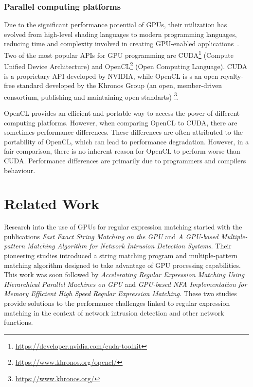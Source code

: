 \documentclass[10pt,onecolumn,twoside,english,a4paper]{article}
\begin{document}
\subsubsection{Parallel computing platforms} \label{Parallel computing platforms}
Due to the significant performance potential of GPUs, their  utilization has evolved from high-level shading languages to modern programming languages, reducing time and complexity involved in creating GPU-enabled applications~\cite{Asaduzzaman:Impact_CUDA_OpenCL}.
Two of the most popular APIs for GPU programming are CUDA\footnote{\url{https://developer.nvidia.com/cuda-toolkit}} (Compute Unified Device Architecture) and OpenCL\footnote{\url{https://www.khronos.org/opencl/}} (Open Computing Language). CUDA is a proprietary API developed by NVIDIA, while OpenCL is s an open royalty-free standard developed by the Khronos Group (an open, member-driven consortium, publishing and maintaining open standarts) \footnote{\url{https://www.khronos.org/}}.

OpenCL provides an efficient and portable way to access the power of different computing platforms. However, when comparing OpenCL to CUDA, there are sometimes performance differences. These differences are often attributed to the portability of OpenCL, which can lead to performance degradation. However, in a fair comparison, there is no inherent reason for OpenCL to perform worse than CUDA. Performance differences are primarily due to programmers and compilers behaviour\cite{Fang:Comparison-cuda-opencl}.

\section{Related Work} \label{Related work}
Research into the use of GPUs for regular expression matching started with the publications \textit{Fast Exact String Matching on the GPU}\cite{schatz2007fast} and \textit{A GPU-based Multiple-pattern Matching Algorithm for Network Intrusion
  Detection Systems}\cite{huang2008gpu}. Their pioneering studies introduced a string matching program and multiple-pattern matching algorithm designed to take advantage of GPU processing capabilities.
This work was soon followed by \textit{Accelerating Regular Expression Matching Using Hierarchical Parallel Machines on GPU}\cite{Lin:regex_gpu_parallel} and \textit{GPU-based NFA Implementation for Memory Efficient High Speed Regular Expression Matching}\cite{Zu:GPU-NFA}. These two studies provide solutions to the performance challenges linked to regular expression matching in the context of network intrusion detection and other network functions.
\end{document}
